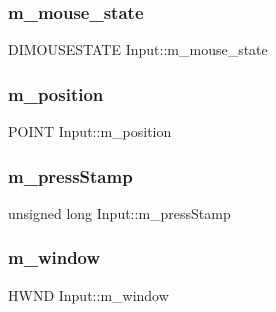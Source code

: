 \hypertarget{class_input_a6507d3096421698410d71e6a160a5d16}{}\label{class_input_a6507d3096421698410d71e6a160a5d16} 
\subsubsection{\texorpdfstring{m\+\_\+mouse\+\_\+state}{m\_mouse\_state}}
{\footnotesize\ttfamily D\+I\+M\+O\+U\+S\+E\+S\+T\+A\+TE Input\+::m\+\_\+mouse\+\_\+state\hspace{0.3cm}{\ttfamily [private]}}

\hypertarget{class_input_a974fd68343b833561316619976a90ec1}{}\label{class_input_a974fd68343b833561316619976a90ec1} 
\subsubsection{\texorpdfstring{m\+\_\+position}{m\_position}}
{\footnotesize\ttfamily P\+O\+I\+NT Input\+::m\+\_\+position\hspace{0.3cm}{\ttfamily [private]}}

\hypertarget{class_input_a301f123d7ad61e21568a514d08219bf7}{}\label{class_input_a301f123d7ad61e21568a514d08219bf7} 
\subsubsection{\texorpdfstring{m\+\_\+press\+Stamp}{m\_pressStamp}}
{\footnotesize\ttfamily unsigned long Input\+::m\+\_\+press\+Stamp\hspace{0.3cm}{\ttfamily [private]}}

\hypertarget{class_input_a6485841e7ce6e512ba04a8802481bf42}{}\label{class_input_a6485841e7ce6e512ba04a8802481bf42} 
\subsubsection{\texorpdfstring{m\+\_\+window}{m\_window}}
{\footnotesize\ttfamily H\+W\+ND Input\+::m\+\_\+window\hspace{0.3cm}{\ttfamily [private]}}

